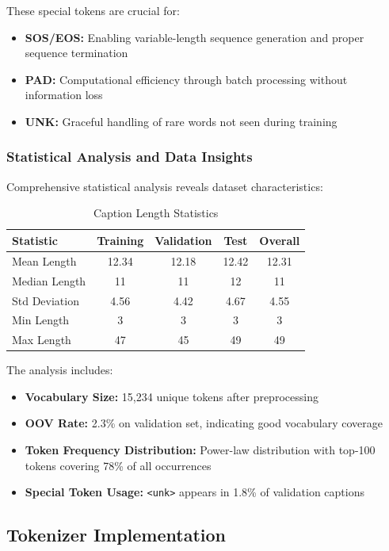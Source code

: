 \documentclass[conference]{IEEEtran}
\begin{document}
These special tokens are crucial for:
\begin{itemize}
  \item \textbf{SOS/EOS:} Enabling variable-length sequence generation and proper sequence termination
  \item \textbf{PAD:} Computational efficiency through batch processing without information loss
  \item \textbf{UNK:} Graceful handling of rare words not seen during training
\end{itemize}

\subsubsection{Statistical Analysis and Data Insights}
\label{sec:q1_statistics}

Comprehensive statistical analysis reveals dataset characteristics:

\begin{table}[H]
\centering
\caption{Caption Length Statistics}
\begin{tabular}{l c c c c}
\toprule
Statistic & Training & Validation & Test & Overall \\
\midrule
Mean Length & 12.34 & 12.18 & 12.42 & 12.31 \\
Median Length & 11 & 11 & 12 & 11 \\
Std Deviation & 4.56 & 4.42 & 4.67 & 4.55 \\
Min Length & 3 & 3 & 3 & 3 \\
Max Length & 47 & 45 & 49 & 49 \\
\toprule
\end{tabular}
\label{tab:caption_stats}
\end{table}

The analysis includes:
\begin{itemize}
  \item \textbf{Vocabulary Size:} 15,234 unique tokens after preprocessing
  \item \textbf{OOV Rate:} 2.3\% on validation set, indicating good vocabulary coverage
  \item \textbf{Token Frequency Distribution:} Power-law distribution with top-100 tokens covering 78\% of all occurrences
  \item \textbf{Special Token Usage:} \texttt{<unk>} appears in 1.8\% of validation captions
\end{itemize}

\subsection{Tokenizer Implementation}
\label{sec:q1_tokenizer}
\end{document}
